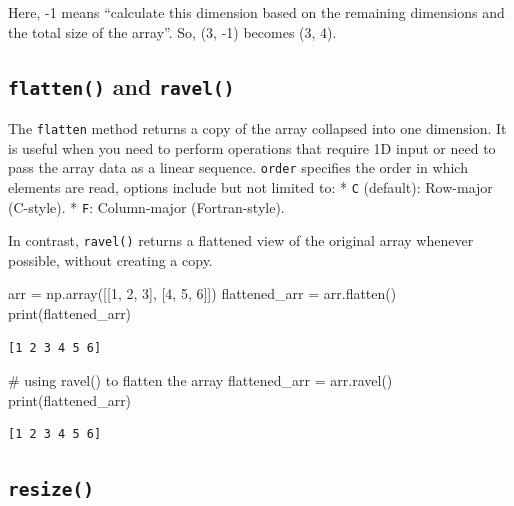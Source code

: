 \documentclass[
  letterpaper,
  DIV=11,
  numbers=noendperiod]{scrreprt}
\newenvironment{Shaded}{\begin{snugshade}}{\end{snugshade}}
\newcommand{\BuiltInTok}[1]{\textcolor[rgb]{0.00,0.23,0.31}{#1}}
\newcommand{\CommentTok}[1]{\textcolor[rgb]{0.37,0.37,0.37}{#1}}
\newcommand{\DecValTok}[1]{\textcolor[rgb]{0.68,0.00,0.00}{#1}}
\newcommand{\NormalTok}[1]{\textcolor[rgb]{0.00,0.23,0.31}{#1}}
\newcommand{\OperatorTok}[1]{\textcolor[rgb]{0.37,0.37,0.37}{#1}}
\begin{document}
Here, -1 means ``calculate this dimension based on the remaining
dimensions and the total size of the array''. So, (3, -1) becomes (3,
4).

\hypertarget{flatten-and-ravel}{%
\subsection{\texorpdfstring{\texttt{flatten()} and
\texttt{ravel()}}{flatten() and ravel()}}\label{flatten-and-ravel}}

The \texttt{flatten} method returns a copy of the array collapsed into
one dimension. It is useful when you need to perform operations that
require 1D input or need to pass the array data as a linear sequence.
\texttt{order} specifies the order in which elements are read, options
include but not limited to: * \texttt{C} (default): Row-major (C-style).
* \texttt{F}: Column-major (Fortran-style).

In contrast, \texttt{ravel()} returns a flattened view of the original
array whenever possible, without creating a copy.

\begin{Shaded}
\begin{Highlighting}[]
\NormalTok{arr }\OperatorTok{=}\NormalTok{ np.array([[}\DecValTok{1}\NormalTok{, }\DecValTok{2}\NormalTok{, }\DecValTok{3}\NormalTok{], [}\DecValTok{4}\NormalTok{, }\DecValTok{5}\NormalTok{, }\DecValTok{6}\NormalTok{]])}
\NormalTok{flattened\_arr }\OperatorTok{=}\NormalTok{ arr.flatten()}
\BuiltInTok{print}\NormalTok{(flattened\_arr)}
\end{Highlighting}
\end{Shaded}

\begin{verbatim}
[1 2 3 4 5 6]
\end{verbatim}

\begin{Shaded}
\begin{Highlighting}[]
\CommentTok{\# using ravel() to flatten the array}
\NormalTok{flattened\_arr }\OperatorTok{=}\NormalTok{ arr.ravel()}
\BuiltInTok{print}\NormalTok{(flattened\_arr)}
\end{Highlighting}
\end{Shaded}

\begin{verbatim}
[1 2 3 4 5 6]
\end{verbatim}

\hypertarget{resize}{%
\subsection{\texorpdfstring{\texttt{resize()}}{resize()}}\label{resize}}
\end{document}
